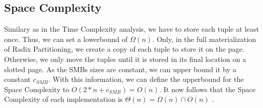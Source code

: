 \subsection{Space Complexity}
Similary as in the Time Complexity analysis, we have to store each tuple at least once.
Thus, we can set a lowerbound of $\Omega(n)$.
Only, in the full materialization of Radix Partitioning, we create a copy of each tuple to store it on the page.
Otherwise, we only move the tuples until it is stored in its final location on a slotted page.
As the \aclp{SMB} sizes are constant, we can upper bound it by a constant $c_{SMB}$.
With this information, we can define the upperbound for the Space Complexity to $O(2 * n + c_{SMB}) = O(n)$.
It now follows that the Space Complexity of each implementation is $\Theta(n) = \Omega(n) \cap O(n) $ .
